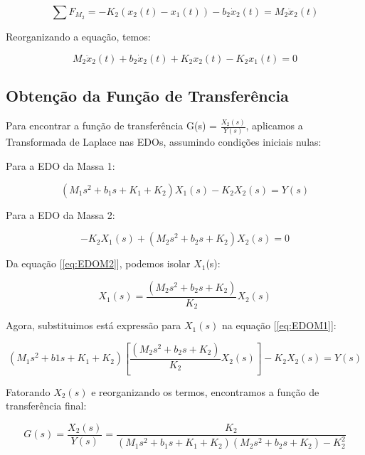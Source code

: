 \documentclass[9pt,a4paper,twocolumn,twoside]{tau-class/tau}
\begin{document}
\begin{equation}
    \sum F_{M_2} = -K_2(x_2(t) - x_1(t)) - b_2\dot{x}_2(t) = M_2 \ddot{x}_2(t)
    \label{eq:M2}
\end{equation}

Reorganizando a equação, temos:

\begin{equation}
    M_2 \ddot{x}_2(t) + b_2\dot{x}_2(t) + K_2 x_2(t) - K_2 x_1(t) =  0
    \label{M2reorg}
\end{equation}

\subsection{Obtenção da Função de Transferência}

Para encontrar a função de transferência G(s) = $\frac{X_2(s)}{Y(s)}$, aplicamos a Transformada de Laplace nas EDOs, assumindo condições iniciais nulas:

Para a EDO da Massa 1:

\begin{equation}
    (M_1s^2 + b_1s + K_1 + K_2)X_1(s) - K_2X_2(s) = Y(s)
    \label{eq:EDOM1}
\end{equation}

Para a EDO da Massa 2:

\begin{equation}
    -K_2X_1(s) + (M_2s^2 + b_2s + K_2)X_2(s) = 0
    \label{eq:EDOM2}
\end{equation}

Da equação [\ref{eq:EDOM2}], podemos isolar $X_1$(s):

\begin{equation}
    X_1(s) = \frac{(M_2s^2 + b_2s + K_2)}{K_2}X_2(s)
    \label{eq:X1iso}
\end{equation}

Agora, substituimos está expressão para $X_1(s)$ na equação [\ref{eq:EDOM1}]:

\begin{equation}
    (M_1s^2 + b1s + K_1 + K_2)\left[\frac{(M_2s^2 + b_2s + K_2)}{K_2}X_2(s)\right] - K_2X_2(s) = Y(s)
    \label{eq:substX1}
\end{equation}

Fatorando $X_2(s)$ e reorganizando os termos, encontramos a função de transferência final:

\begin{equation}
    G(s) = \frac{X_2 (s)}{Y(s)} = \frac{K_2}{(M_1 s^2 + b_1 s + K_1 + K_2)(M_2 s^2 + b_2 s + K_2) - K_2 ^2}
\label{eq: FT}
\end{equation}
\end{document}

